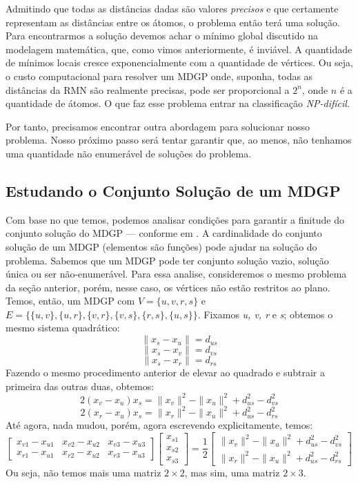 \documentclass[a4paper,12pt]{article}
\begin{document}
	Admitindo que todas as distâncias dadas são valores \textit{precisos} e que certamente representam as distâncias entre os átomos, o problema então terá uma solução. Para encontrarmos a solução devemos achar o mínimo global discutido na modelagem matemática, que, como vimos anteriormente, é inviável. A quantidade de mínimos locais cresce exponencialmente com a quantidade de vértices. Ou seja, o custo computacional para resolver um MDGP onde, suponha, todas as distâncias da RMN são realmente precisas, pode ser proporcional a $2^n$, onde $n$ é a quantidade de átomos. O que faz esse problema entrar na classificação \textit{NP-difícil}. \cite{ComplexidadeComp}
	
	Por tanto, precisamos encontrar outra abordagem para solucionar nosso problema. Nosso próximo passo será tentar garantir que, ao menos, não tenhamos uma quantidade não enumerável de soluções do problema.
	
	\subsection{Estudando o Conjunto Solução de um MDGP}
	Com base no que temos, podemos analisar condições para garantir a finitude do conjunto solução do MDGP --- conforme em \cite{carlileBook31Coloquio}. A cardinalidade do conjunto solução de um MDGP (elementos são funções) pode ajudar na solução do problema. Sabemos que um MDGP pode ter conjunto solução vazio, solução única ou ser não-enumerável. Para essa analise, consideremos o mesmo problema da seção anterior, porém, nesse caso, os vértices não estão restritos ao plano. Temos, então, um MDGP com $V=\{u, v, r, s\}$ e $E=\{\{u,v\}, \{u, r\}, \{v, r\}, \{v, s\}, \{r, s\}, \{u, s\}\}$. Fixamos \textit{u, v, r} e \textit{s}; obtemos o mesmo sistema quadrático:
	$$
	\|x_{s} - x_{u}\|= d_{us}
	$$
	$$
	\|x_{s} - x_{v}\|= d_{vs}
	$$
	$$
	\|x_{s} - x_{r}\|= d_{rs}
	$$
	Fazendo o mesmo procedimento anterior de elevar ao quadrado e subtrair a primeira das outras duas, obtemos:
	$$
	2(x_{v} - x_{u})x_{s} = \|x_{v}\|^{2} - \|x_{u}\|^{2} + d_{us}^{2} - d_{vs}^{2}
	$$
	$$
	2(x_{r} - x_{u})x_{s} = \|x_{r}\|^{2} - \|x_{u}\|^{2} + d_{us}^{2} - d_{rs}^{2}
	$$
	Até agora, nada mudou, porém, agora escrevendo explicitamente, temos:
	$$
	\begin{bmatrix}
	x_{v1} - x_{u1} & x_{v2} - x_{u2} & x_{v3} - x_{u3}\\
	x_{r1} - x_{u1} & x_{r2} - x_{u2} & x_{r3} - x_{u3}
	\end{bmatrix}
	\begin{bmatrix}
	x_{s1}\\
	x_{s2}\\
	x_{s3}
	\end{bmatrix} =
	\frac{1}{2}\begin{bmatrix}
	\|x_{v}\|^{2} - \|x_{u}\|^{2} + d_{us}^{2} - d_{vs}^{2}\\
	\|x_{r}\|^{2} - \|x_{u}\|^{2} + d_{us}^{2} - d_{rs}^{2}
	\end{bmatrix}
	$$
	Ou seja, não temos mais uma matriz $2 \times 2$, mas  sim, uma matriz $2 \times 3$.
	
\end{document}
